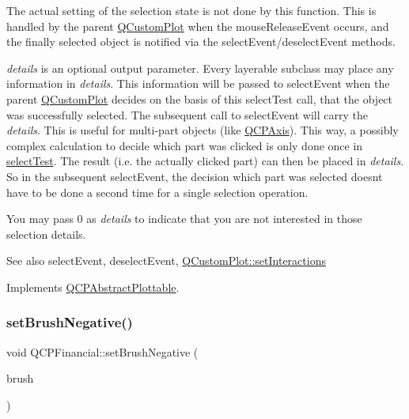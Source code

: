 The actual setting of the selection state is not done by this function. This is handled by the parent \mbox{\hyperlink{class_q_custom_plot}{Q\+Custom\+Plot}} when the mouse\+Release\+Event occurs, and the finally selected object is notified via the select\+Event/deselect\+Event methods.

{\itshape details} is an optional output parameter. Every layerable subclass may place any information in {\itshape details}. This information will be passed to select\+Event when the parent \mbox{\hyperlink{class_q_custom_plot}{Q\+Custom\+Plot}} decides on the basis of this select\+Test call, that the object was successfully selected. The subsequent call to select\+Event will carry the {\itshape details}. This is useful for multi-\/part objects (like \mbox{\hyperlink{class_q_c_p_axis}{Q\+C\+P\+Axis}}). This way, a possibly complex calculation to decide which part was clicked is only done once in \mbox{\hyperlink{class_q_c_p_financial_a77bffad8f3fcbcccbef03ead1c538e3a}{select\+Test}}. The result (i.\+e. the actually clicked part) can then be placed in {\itshape details}. So in the subsequent select\+Event, the decision which part was selected doesn\textquotesingle{}t have to be done a second time for a single selection operation.

You may pass 0 as {\itshape details} to indicate that you are not interested in those selection details.

\begin{DoxySeeAlso}{See also}
select\+Event, deselect\+Event, \mbox{\hyperlink{class_q_custom_plot_a5ee1e2f6ae27419deca53e75907c27e5}{Q\+Custom\+Plot\+::set\+Interactions}} 
\end{DoxySeeAlso}


Implements \mbox{\hyperlink{class_q_c_p_abstract_plottable_a38efe9641d972992a3d44204bc80ec1d}{Q\+C\+P\+Abstract\+Plottable}}.

\mbox{\label{class_q_c_p_financial_a8bbdd87629f9144b3ef51af660c0961a}} 
\subsubsection{\texorpdfstring{set\+Brush\+Negative()}{setBrushNegative()}}
{\footnotesize\ttfamily void Q\+C\+P\+Financial\+::set\+Brush\+Negative (\begin{DoxyParamCaption}\item[{const Q\+Brush \&}]{brush }\end{DoxyParamCaption})}

